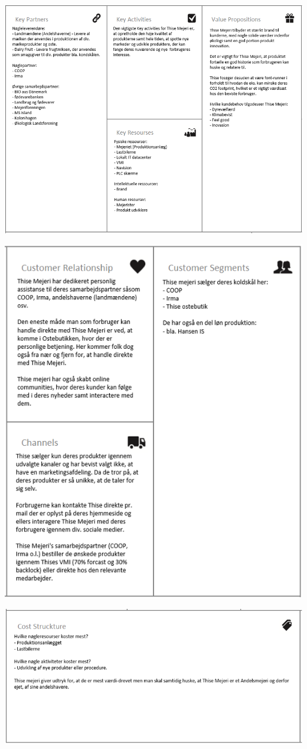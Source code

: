 \documentclass[
  12pt,
  a4paper,
  DIV=11,
  numbers=noendperiod]{scrartcl}
\begin{document}
\includegraphics{images/image-481320815.png}

\includegraphics{images/image-1052926965.png}

\includegraphics{images/image-878613547.png}
\end{document}
